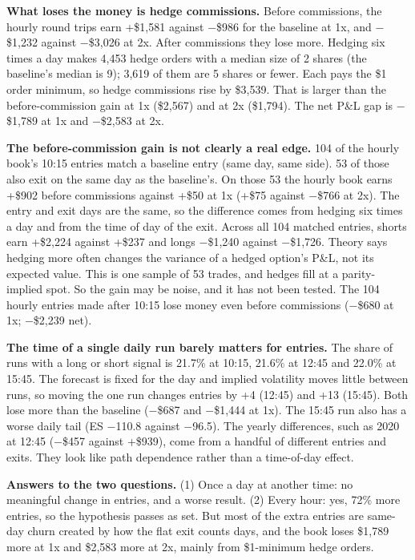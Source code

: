 \documentclass{article}
\begin{document}
\textbf{What loses the money is hedge commissions.} Before commissions, the hourly round trips earn +\$1,581 against \ensuremath{-}\$986 for the baseline at 1x, and \ensuremath{-}\$1,232 against \ensuremath{-}\$3,026 at 2x. After commissions they lose more. Hedging six times a day makes 4,453 hedge orders with a median size of 2 shares (the baseline's median is 9); 3,619 of them are 5 shares or fewer. Each pays the \$1 order minimum, so hedge commissions rise by \$3,539. That is larger than the before-commission gain at 1x (\$2,567) and at 2x (\$1,794). The net P\&L gap is \ensuremath{-}\$1,789 at 1x and \ensuremath{-}\$2,583 at 2x.

\textbf{The before-commission gain is not clearly a real edge.} 104 of the hourly book's 10:15 entries match a baseline entry (same day, same side). 53 of those also exit on the same day as the baseline's. On those 53 the hourly book earns +\$902 before commissions against +\$50 at 1x (+\$75 against \ensuremath{-}\$766 at 2x). The entry and exit days are the same, so the difference comes from hedging six times a day and from the time of day of the exit. Across all 104 matched entries, shorts earn +\$2,224 against +\$237 and longs \ensuremath{-}\$1,240 against \ensuremath{-}\$1,726. Theory says hedging more often changes the variance of a hedged option's P\&L, not its expected value. This is one sample of 53 trades, and hedges fill at a parity-implied spot. So the gain may be noise, and it has not been tested. The 104 hourly entries made after 10:15 lose money even before commissions (\ensuremath{-}\$680 at 1x; \ensuremath{-}\$2,239 net).

\textbf{The time of a single daily run barely matters for entries.} The share of runs with a long or short signal is 21.7\% at 10:15, 21.6\% at 12:45 and 22.0\% at 15:45. The forecast is fixed for the day and implied volatility moves little between runs, so moving the one run changes entries by +4 (12:45) and +13 (15:45). Both lose more than the baseline (\ensuremath{-}\$687 and \ensuremath{-}\$1,444 at 1x). The 15:45 run also has a worse daily tail (ES \ensuremath{-}110.8 against \ensuremath{-}96.5). The yearly differences, such as 2020 at 12:45 (\ensuremath{-}\$457 against +\$939), come from a handful of different entries and exits. They look like path dependence rather than a time-of-day effect.

\textbf{Answers to the two questions.} (1) Once a day at another time: no meaningful change in entries, and a worse result. (2) Every hour: yes, 72\% more entries, so the hypothesis passes as set. But most of the extra entries are same-day churn created by how the flat exit counts days, and the book loses \$1,789 more at 1x and \$2,583 more at 2x, mainly from \$1-minimum hedge orders.
\end{document}
